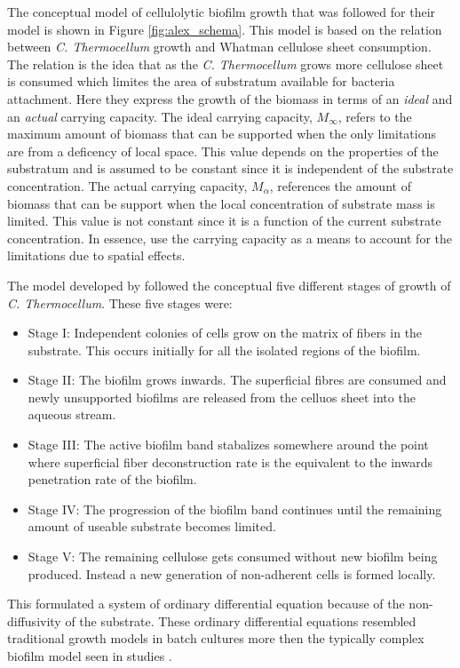 The conceptual model of cellulolytic biofilm growth that was followed for their model is shown in Figure \ref{fig:alex_schema}.
This model is based on the relation between \textit{C. Thermocellum} growth and Whatman cellulose sheet consumption.
The relation is the idea that as the \textit{C. Thermocellum} grows more cellulose sheet is consumed which limites the area of substratum available for bacteria attachment.
Here they express the growth of the biomass in terms of an \textit{ideal} and an \textit{actual} carrying capacity.
The ideal carrying capacity, $M_{\infty}$, refers to the maximum amount of biomass that can be supported when the only limitations are from a deficency of local space.
This value depends on the properties of the substratum and is assumed to be constant since it is independent of the substrate concentration.
The actual carrying capacity, $M_{\alpha}$, references the amount of biomass that can be support when the local concentration of substrate mass is limited.
This value is not constant since it is a function of the current substrate concentration.
In essence, \cite{dumitrache2014understanding} use the carrying capacity as a means to account for the limitations due to spatial effects.

The model developed by \cite{dumitrache2015mathematicalModeling} followed the conceptual five different stages of growth of \textit{C. Thermocellum}.
These five stages were:
\begin{itemize}
  \item Stage I: Independent colonies of cells grow on the matrix of fibers in the substrate. This occurs initially for all the isolated regions of the biofilm.
  \item Stage II: The biofilm grows inwards. The superficial fibres are consumed and newly unsupported biofilms are released from the celluos sheet into the aqueous stream.
  \item Stage III: The active biofilm band stabalizes somewhere around the point where superficial fiber deconstruction rate is the equivalent to the inwards penetration rate of the biofilm.
  \item Stage IV: The progression of the biofilm band continues until the remaining amount of useable substrate becomes limited.
  \item Stage V: The remaining cellulose gets consumed without new biofilm being produced. Instead a new generation of non-adherent cells is formed locally.
\end{itemize}
This formulated a system of ordinary differential equation because of the non-diffusivity of the substrate.
These ordinary differential equations resembled traditional growth models in batch cultures more then the typically complex biofilm model seen in studies \citep{wanner2005mathematical}. %

